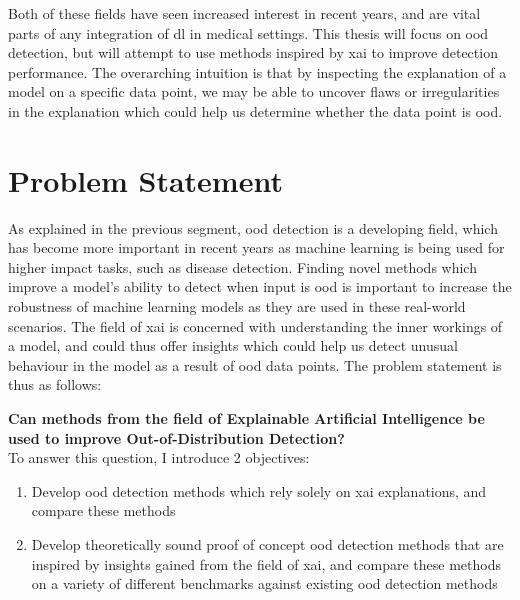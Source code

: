 \documentclass[UKenglish]{uiomasterthesis} %
\theoremstyle{definition}
\begin{document}
Both of these fields have seen increased interest in recent years, and are vital parts of any integration of \ac{dl} in medical settings. This thesis will focus on \ac{ood} detection, but will attempt to use methods inspired by \ac{xai} to improve detection performance. The overarching intuition is that by inspecting the explanation of a model on a specific data point, we may be able to uncover flaws or irregularities in the explanation which could help us determine whether the data point is \ac{ood}.


\section{Problem Statement} \label{section:problemstatement}

As explained in the previous segment, \ac{ood} detection is a developing field, which has become more important in recent years as machine learning is being used for higher impact tasks, such as disease detection. Finding novel methods which improve a model's ability to detect when input is \ac{ood} is important to increase the robustness of machine learning models as they are used in these real-world scenarios. The field of \ac{xai} is concerned with understanding the inner workings of a model, and could thus offer insights which could help us detect unusual behaviour in the model as a result of \ac{ood} data points. The problem statement is thus as follows:

\textbf{Can methods from the field of Explainable Artificial Intelligence be used to improve Out-of-Distribution Detection?}
\\

To answer this question, I introduce 2 objectives:

\begin{enumerate}
    \item Develop \ac{ood} detection methods which rely solely on \ac{xai} explanations, and compare these methods 
    \item Develop theoretically sound proof of concept \ac{ood} detection methods that are inspired by insights gained from the field of \ac{xai}, and compare these methods on a variety of different benchmarks against existing \ac{ood} detection methods
\end{enumerate}
\end{document}
